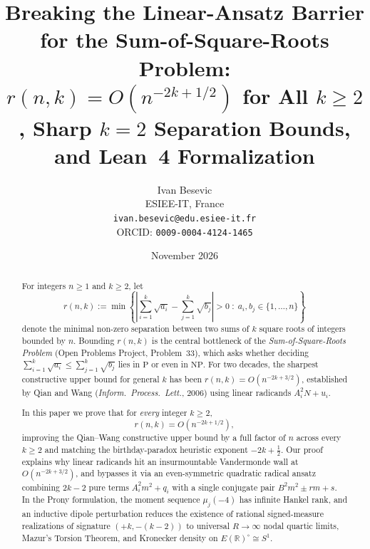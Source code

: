 \documentclass[11pt,a4paper]{article}
\title{Breaking the Linear-Ansatz Barrier for the Sum-of-Square-Roots Problem:\\
$r(n, k) = O(n^{-2k + 1/2})$ for All $k \ge 2$, Sharp $k = 2$ Separation Bounds,\\
and Lean~4 Formalization}
\author{Ivan Besevic\\
ESIEE-IT, France\\
\texttt{ivan.besevic@edu.esiee-it.fr}\\
ORCID: \texttt{0009-0004-4124-1465}}
\date{November 2026}
\theoremstyle{definition}
\theoremstyle{remark}
\newcommand{\RR}{\mathbb{R}}
\begin{document}
\maketitle

\begin{abstract}
For integers $n \ge 1$ and $k \ge 2$, let
\[
r(n, k) := \min \left\{ \left| \sum_{i=1}^k \sqrt{a_i} - \sum_{j=1}^k \sqrt{b_j} \right| > 0 \;:\; a_i, b_j \in \{1, \dots, n\} \right\}
\]
denote the minimal non-zero separation between two sums of $k$ square roots of integers bounded by $n$. Bounding $r(n, k)$ is the central bottleneck of the \emph{Sum-of-Square-Roots Problem} (Open Problems Project, Problem~33), which asks whether deciding $\sum_{i=1}^k \sqrt{a_i} \le \sum_{j=1}^k \sqrt{b_j}$ lies in $\mathrm{P}$ or even in $\mathrm{NP}$. For two decades, the sharpest constructive upper bound for general $k$ has been $r(n, k) = O(n^{-2k + 3/2})$, established by Qian and Wang (\emph{Inform.\ Process.\ Lett.}, 2006) using linear radicands $A_i^2 N + u_i$.

In this paper we prove that for \emph{every} integer $k \ge 2$,
\[
r(n, k) = O\!\left(n^{-2k + 1/2}\right),
\]
improving the Qian--Wang constructive upper bound by a full factor of $n$ across every $k \ge 2$ and matching the birthday-paradox heuristic exponent $-2k + \frac{1}{2}$. Our proof explains why linear radicands hit an insurmountable Vandermonde wall at $O(n^{-2k + 3/2})$, and bypasses it via an even-symmetric quadratic radical ansatz combining $2k - 2$ pure terms $A_i^2 m^2 + q_i$ with a single conjugate pair $B^2 m^2 \pm r m + s$. In the Prony formulation, the moment sequence $\mu_j(-4)$ has infinite Hankel rank, and an inductive dipole perturbation reduces the existence of rational signed-measure realizations of signature $(+k, -(k-2))$ to universal $R \to \infty$ nodal quartic limits, Mazur's Torsion Theorem, and Kronecker density on $E(\RR)^\circ \cong S^1$.


\end{abstract}
\end{document}
